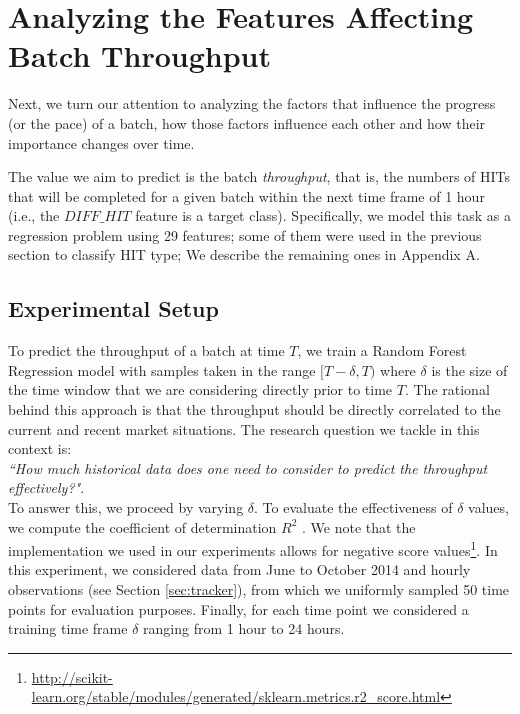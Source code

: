 \section{Analyzing the Features Affecting Batch Throughput}
\label{sec:throughput}
Next, we turn our attention to analyzing the factors that influence the progress (or the pace) of a batch, how those factors influence each other and how their importance changes over time. 

The value we aim to predict is the batch \emph{throughput}, that is, the numbers of HITs that  will be completed for a given batch within the next time frame of 1 hour (i.e.,  the $DIFF\_HIT$ feature is a target class).
Specifically, we model this task as a regression problem using 29 features; some of them were used in the previous section to classify HIT type; We describe the remaining ones in Appendix A.

\subsection{Experimental Setup}

To predict the throughput of a batch at time $T$, we train a Random Forest Regression model with samples taken in the range $[T-\delta, T)$ where $\delta$ is the size of the time window that we are   considering directly prior to time $T$. The rational behind this approach is that the throughput should be directly correlated to the current and recent market situations. 
The research question we tackle in this context is:\\ \emph{``How much historical data does one need to consider to predict the throughput effectively?"}. \\ To answer this, we proceed by varying $\delta$.
To evaluate the effectiveness of $\delta$ values, we compute the coefficient of determination $R^2$ \cite{sklearnweb, sklearn}. We note that the implementation we used in our experiments allows for negative score values\footnote{\url{http://scikit-learn.org/stable/modules/generated/sklearn.metrics.r2_score.html}}.
In this experiment, we considered  data from June to October 2014 and hourly observations (see Section \ref{sec:tracker}), from which we uniformly sampled 50 time points for evaluation purposes. Finally, for each time point we considered a training time frame $\delta$ ranging from 1 hour to 24 hours. 

